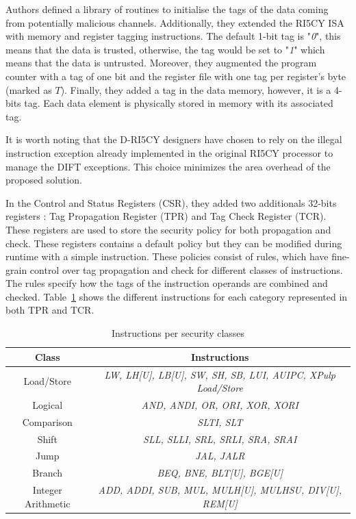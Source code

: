 Authors defined a library of routines to initialise the tags of the data coming from potentially malicious channels. Additionally, they extended the RI5CY ISA with memory and register tagging instructions. The default 1-bit tag is "\textit{0}", this means that the data is trusted, otherwise, the tag would be set to "\textit{1}" which means that the data is untrusted.
Moreover, they augmented the program counter with a tag of one bit and the register file with one tag per register's byte (marked as $T$). Finally, they added a tag in the data memory, however, it is a 4-bits tag.
Each data element is physically stored in memory with its associated tag.

It is worth noting that the D-RI5CY designers have chosen to rely on the illegal instruction exception already implemented in the original RI5CY processor to manage the DIFT exceptions. This choice minimizes the area overhead of the proposed solution.

In the Control and Status Registers (CSR), they added two additionals 32-bits registers : Tag Propagation Register (TPR) and Tag Check Register (TCR). These registers are used to store the security policy for both propagation and check. These registers contains a default policy but they can be modified during runtime with a simple instruction. These policies consist of rules, which have fine-grain control over tag propagation and check for different classes of instructions. The rules specify how the tags of the instruction operands are combined and checked.
Table~\ref{tab:insnClasses} shows the different instructions for each category represented in both TPR and TCR.

\begin{table}[t]
    \centering
    \caption{Instructions per security classes}
    \label{tab:insnClasses}
    \begin{tabular}{@{}cc@{}}
        \toprule
        \textbf{Class} & \textbf{Instructions} \\ \midrule
        Load/Store & \textit{LW, LH{[}U{]}, LB{[}U{]}, SW, SH, SB, LUI, AUIPC, XPulp Load/Store} \\
        Logical & \textit{AND, ANDI, OR, ORI, XOR, XORI} \\
        Comparison & \textit{SLTI, SLT} \\
        Shift & \textit{SLL, SLLI, SRL, SRLI, SRA, SRAI} \\
        Jump & \textit{JAL, JALR} \\
        Branch & \textit{BEQ, BNE, BLT{[}U{]}, BGE{[}U{]}} \\
        Integer Arithmetic & \textit{ADD, ADDI, SUB, MUL, MULH{[}U{]}, MULHSU, DIV{[}U{]}, REM{[}U{]}} \\ \bottomrule
    \end{tabular}
\end{table}


